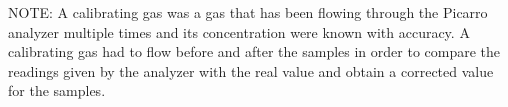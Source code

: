 NOTE: A calibrating gas was a gas that has been flowing through the Picarro analyzer multiple times and its concentration were known with accuracy. A calibrating gas had to flow before and after the samples in order to compare the readings given by the analyzer with the real value and obtain a corrected value for the samples. 

